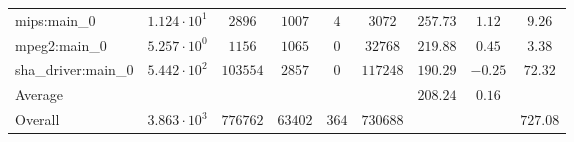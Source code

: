 \begin{tabular}{|l|c|c|c|c|c|c|c|c|}
mips:main\_0            & $ 1.124 \cdot 10^{1}  $ & $ 2896   $ & $ 1007  $ & $ 4   $ & $ 3072   $ & $ 257.73      $ & $ 1.12    $ & $ 9.26    $ \\
mpeg2:main\_0           & $ 5.257 \cdot 10^{0}  $ & $ 1156   $ & $ 1065  $ & $ 0   $ & $ 32768  $ & $ 219.88      $ & $ 0.45    $ & $ 3.38    $ \\
sha\_driver:main\_0     & $ 5.442 \cdot 10^{2}  $ & $ 103554 $ & $ 2857  $ & $ 0   $ & $ 117248 $ & $ 190.29      $ & $ -0.25   $ & $ 72.32   $ \\
\hline
Average                 & $                     $ & $        $ & $       $ & $     $ & $        $ & $ 208.24      $ & $ 0.16    $ & $         $ \\
\hline
Overall                 & $ 3.863 \cdot 10^{3}  $ & $ 776762 $ & $ 63402 $ & $ 364 $ & $ 730688 $ & $             $ & $         $ & $ 727.08  $ \\
\hline
\end{tabular}
